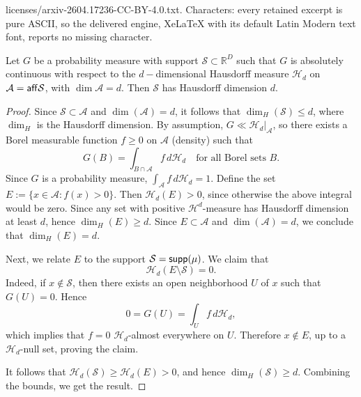 \documentclass[10pt,a4paper]{amsart}
\def\aff{{\sf aff}}
\def\bbR{\mathbb{R}}
\def\cA{\mathcal{A}}
\def\cH{\mathcal{H}}
\def\cS{\mathcal{S}}
\def\supp{{\sf supp}}
\begin{document}
licenses/arxiv-2604.17236-CC-BY-4.0.txt. Characters: every retained excerpt is pure ASCII, so the delivered engine, XeLaTeX with its default Latin Modern text font, reports no missing character.
\begin{lemma}
    Let $G$ be a probability measure with support $\cS\subset\bbR^D$ such that $G$ is absolutely continuous with respect to the $d-$dimensional Hausdorff measure $\cH_d$ on $\cA=\aff \cS$, with $\dim \cA = d$. Then $\cS$ has Hausdorff dimension $d$.
\end{lemma}

\begin{proof}
   Since $\cS \subset \cA$ and $\dim(\cA)=d$, it follows that $\dim_H(\cS) \le d$, where $\dim_H$ is the Hausdorff dimension. By assumption, $G \ll \mathcal{H}_d |_{\cA}$, so there exists a Borel measurable function $f \ge 0$ on $\cA$ (density) such that
\[
G(B) = \int_{B \cap \cA} f \, d\mathcal{H}_d
\quad \text{for all Borel sets } B.
\]
Since $G$ is a probability measure,
$\int_{\cA} f \, d\mathcal{H}_d = 1$. Define the set $E := \{ x \in \cA : f(x) > 0 \}$. 
Then $\mathcal{H}_d(E) > 0$, since otherwise the above integral would be zero. Since any set with positive $\mathcal{H}^d$-measure has Hausdorff dimension at least $d$, hence $\dim_H(E) \ge d$.
Since $E \subset \cA$ and $\dim(\cA)=d$, we conclude that $\dim_H(E) = d$.

Next, we relate $E$ to the support $\cS = \supp(\mu)$. We claim that
\[
\mathcal{H}_d(E \setminus \cS) = 0.
\]
Indeed, if $x \notin \cS$, then there exists an open neighborhood $U$ of $x$ such that $G(U)=0$. Hence
\[
0 = G(U) = \int_U f \, d\mathcal{H}_d,
\]
which implies that $f=0$ $\mathcal{H}_d$-almost everywhere on $U$. Therefore $x \notin E$, up to a $\mathcal{H}_d$-null set, proving the claim.

It follows that $\mathcal{H}_d(\cS) \ge \mathcal{H}_d(E) > 0$, and hence
$\dim_H(\cS) \ge d$. Combining the bounds, we get the result.
\end{proof}
\end{document}
